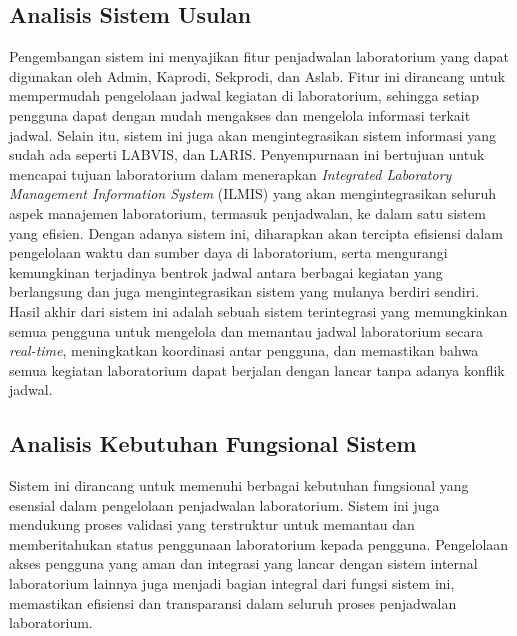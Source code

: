 \subsection{Analisis Sistem Usulan}
Pengembangan sistem ini menyajikan fitur penjadwalan laboratorium yang dapat digunakan oleh Admin, Kaprodi, Sekprodi, dan Aslab. Fitur ini dirancang untuk mempermudah pengelolaan jadwal kegiatan di laboratorium, sehingga setiap pengguna dapat dengan mudah mengakses dan mengelola informasi terkait jadwal. Selain itu, sistem ini juga akan mengintegrasikan sistem informasi yang sudah ada seperti LABVIS, dan LARIS. Penyempurnaan ini bertujuan untuk mencapai tujuan laboratorium dalam menerapkan \textit{Integrated Laboratory Management Information System} (ILMIS) yang akan mengintegrasikan seluruh aspek manajemen laboratorium, termasuk penjadwalan, ke dalam satu sistem yang efisien. Dengan adanya sistem ini, diharapkan akan tercipta efisiensi dalam pengelolaan waktu dan sumber daya di laboratorium, serta mengurangi kemungkinan terjadinya bentrok jadwal antara berbagai kegiatan yang berlangsung dan juga mengintegrasikan sistem yang mulanya berdiri sendiri. Hasil akhir dari sistem ini adalah sebuah sistem terintegrasi yang memungkinkan semua pengguna untuk mengelola dan memantau jadwal laboratorium secara \textit{real-time}, meningkatkan koordinasi antar pengguna, dan memastikan bahwa semua kegiatan laboratorium dapat berjalan dengan lancar tanpa adanya konflik jadwal.

\subsection{Analisis Kebutuhan Fungsional Sistem}
Sistem ini dirancang untuk memenuhi berbagai kebutuhan fungsional yang esensial dalam pengelolaan penjadwalan laboratorium. Sistem ini juga mendukung proses validasi yang terstruktur  untuk memantau dan memberitahukan status penggunaan laboratorium kepada pengguna. Pengelolaan akses pengguna yang aman dan integrasi yang lancar dengan sistem internal laboratorium lainnya juga menjadi bagian integral dari fungsi sistem ini, memastikan efisiensi dan transparansi dalam seluruh proses penjadwalan laboratorium.

